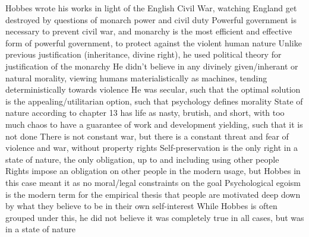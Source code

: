 \documentclass[11 pt, twoside]{article}
\newenvironment{outline*}
{
	\begin{outline}[enumerate]
	}
	{\end{outline}
}
\begin{document}
\begin{outline*}
\1 Hobbes wrote his works in light of the English Civil War, watching England get destroyed by questions of monarch power and civil duty
	\2 Powerful government is necessary to prevent civil war, and monarchy is the most efficient and effective form of powerful government, to protect against the violent human nature
		\3 Unlike previous justification (inheritance, divine right), he used political theory for justification of the monarchy
		\3 He didn't believe in any divinely given/inherant or natural morality, viewing humans materialistically as machines, tending deterministically towards violence
	\2 He was secular, such that the optimal solution is the appealing/utilitarian option, such that psychology defines morality
	\2 State of nature according to chapter 13 has life as nasty, brutish, and short, with too much chaos to have a guarantee of work and development yielding, such that it is not done
		\3 There is not constant war, but there is a constant threat and fear of violence and war, without property rights
		\3 Self-preservation is the only right in a state of nature, the only obligation, up to and including using other people
			\4 Rights impose an obligation on other people in the modern usage, but Hobbes in this case meant it as no moral/legal constraints on the goal
	\2 Psychological egoism is the modern term for the empirical thesis that people are motivated deep down by what they believe to be in their own self-interest
		\3 While Hobbes is often grouped under this, he did not believe it was completely true in all cases, but was in a state of nature
\end{outline*}
\end{document}
